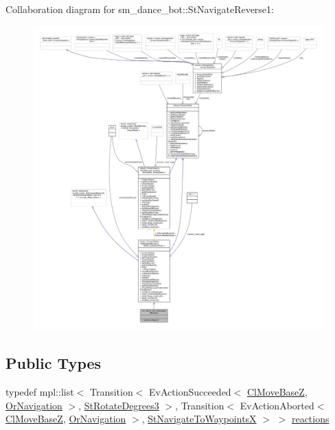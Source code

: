 Collaboration diagram for sm\+\_\+dance\+\_\+bot\+:\+:St\+Navigate\+Reverse1\+:
\nopagebreak
\begin{figure}[H]
\begin{center}
\leavevmode
\includegraphics[width=350pt]{structsm__dance__bot_1_1StNavigateReverse1__coll__graph}
\end{center}
\end{figure}
\subsection*{Public Types}
\begin{DoxyCompactItemize}
\item 
typedef mpl\+::list$<$ Transition$<$ Ev\+Action\+Succeeded$<$ \hyperlink{classcl__move__base__z_1_1ClMoveBaseZ}{Cl\+Move\+BaseZ}, \hyperlink{classsm__dance__bot_1_1OrNavigation}{Or\+Navigation} $>$, \hyperlink{structsm__dance__bot_1_1StRotateDegrees3}{St\+Rotate\+Degrees3} $>$, Transition$<$ Ev\+Action\+Aborted$<$ \hyperlink{classcl__move__base__z_1_1ClMoveBaseZ}{Cl\+Move\+BaseZ}, \hyperlink{classsm__dance__bot_1_1OrNavigation}{Or\+Navigation} $>$, \hyperlink{structsm__dance__bot_1_1StNavigateToWaypointsX}{St\+Navigate\+To\+WaypointsX} $>$ $>$ \hyperlink{structsm__dance__bot_1_1StNavigateReverse1_ab71f3a9d0c89ec34654dbffdcbc61c67}{reactions}
\end{DoxyCompactItemize}
